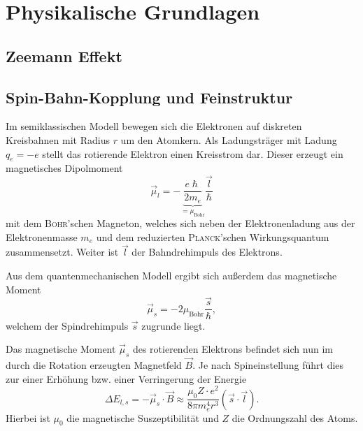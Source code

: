 \documentclass[../bericht.tex]{subfiles}
\begin{document}
  \chapter{Physikalische Grundlagen}

    \section{Zeemann Effekt}
    \label{sec:zeemann}


    \section{Spin-Bahn-Kopplung und Feinstruktur}
    \label{sec:feinstruktur}

      Im semiklassischen Modell bewegen sich die Elektronen auf diskreten Kreisbahnen mit Radius $r$ um den Atomkern. Als Ladungsträger mit Ladung $q_e=-e$ stellt das rotierende Elektron einen Kreisstrom dar. Dieser erzeugt ein magnetisches Dipolmoment
      \begin{equation*}
        \vec{\mu}_l=-\underbrace{\frac{e\hslash}{2m_e}}_{=\mu_\mathrm{Bohr}}\frac{\vec{l}}{\hslash}
      \end{equation*}
      mit dem \textsc{Bohr}'schen Magneton, welches sich neben der Elektronenladung aus der Elektronenmasse $m_e$ und dem reduzierten \textsc{Planck}'schen Wirkungsquantum zusammensetzt. Weiter ist $\vec{l}$ der Bahndrehimpuls des Elektrons.

      Aus dem quantenmechanischen Modell ergibt sich außerdem das magnetische Moment
      \begin{equation*}
        \vec{\mu}_s=-2\mu_\mathrm{Bohr}\frac{\vec{s}}{\hslash},
      \end{equation*}
      welchem der Spindrehimpuls $\vec{s}$ zugrunde liegt.

      Das magnetische Moment $\vec{\mu}_s$ des rotierenden Elektrons befindet sich nun im durch die Rotation erzeugten Magnetfeld $\vec{B}$. Je nach Spineinstellung führt dies zur einer Erhöhung bzw. einer Verringerung der Energie
      \begin{equation}
        \Delta E_{l,s}=-\vec{\mu}_s\cdot \vec{B}\approx \frac{\mu_0Z\cdot e^2}{8\pi m_e^4r^3}\left( \vec{s}\cdot \vec{l}\right).
        \label{eq:feinstruktur-1}
      \end{equation}
      Hierbei ist $\mu_0$ die magnetische Suszeptibilität und $Z$ die Ordnungszahl des Atoms.
\end{document}
